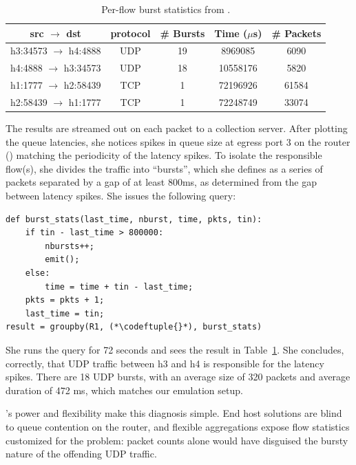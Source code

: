 \begin{table}[t]
\centering
\small
\begin{tabular}{|c|c|c|c|c|} \hline
\bf{src $\rightarrow$ dst} & \bf{protocol} & \bf{\# Bursts} & \bf{Time ($\mu$s)} & \bf{\# Packets} \\ \hline
h3:34573 $\rightarrow$ h4:4888 & UDP & 19 & 8969085 & 6090 \\
h4:4888 $\rightarrow$ h3:34573 & UDP & 18 & 10558176 & 5820 \\
h1:1777 $\rightarrow$ h2:58439 & TCP & 1 & 72196926 & 61584 \\
h2:58439 $\rightarrow$ h1:1777 & TCP & 1 & 72248749 & 33074 \\ \hline
\end{tabular}
\caption{Per-flow burst statistics from \TheSystem.}
\label{t:mininet-flowstats}
\vspace{-0.1in}
\end{table}

The results are streamed out on each packet to a collection server. After
plotting the queue latencies, she notices spikes in queue size at egress port 3
on the router () matching the periodicity of the latency
spikes. To isolate the responsible flow(s), she divides the traffic into
``bursts'', which she defines as a series of packets separated by a gap of at
least 800ms, as determined from the gap between latency spikes. She issues the
following \TheSystem query:

\begin{small}
\begin{lstlisting}
def burst_stats(last_time, nburst, time, pkts, tin):
    if tin - last_time > 800000:
        nbursts++;
        emit();
    else:
        time = time + tin - last_time;
    pkts = pkts + 1;
    last_time = tin;
result = groupby(R1, (*\codeftuple{}*), burst_stats)
\end{lstlisting}
\end{small}


She runs the query for 72 seconds and sees the result in
Table~\ref{t:mininet-flowstats}. She concludes, correctly, that UDP traffic
between {\ct h3} and {\ct h4} is responsible for the latency spikes.
There are 18 UDP bursts, with an average size of 320 packets and
average duration of 472 ms, which matches our emulation setup.

\TheSystem's power and flexibility make this diagnosis simple. End host solutions
 are blind to queue contention on the router, and flexible
aggregations expose flow statistics customized for the problem:
packet counts alone would have disguised the bursty nature of
the offending UDP traffic.

